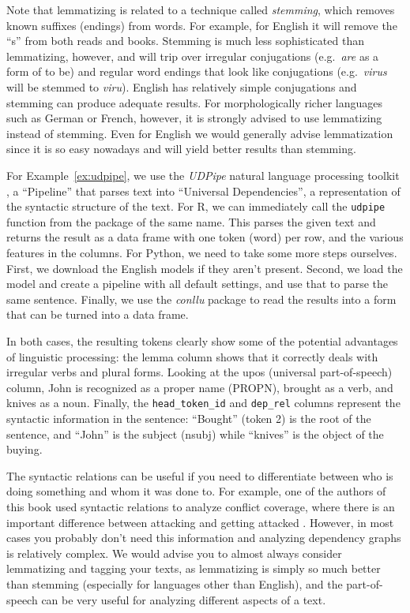 Note that lemmatizing is related to a technique called \emph{stemming}, which removes known suffixes (endings) from words.
For example, for English it will remove the ``s'' from both reads and books.
Stemming is much less sophisticated than lemmatizing, however, and will trip over irregular conjugations
(e.g.\ \emph{are} as a form of to be) and regular word endings that look like conjugations (e.g.\ \emph{virus} will be stemmed to \emph{viru}).
English has relatively simple conjugations and stemming can produce adequate results.
For morphologically richer languages such as German or French, however, it is strongly advised to use lemmatizing instead of stemming.
Even for English we would generally advise lemmatization since it is so easy nowadays and will yield better results than stemming.

For Example~\ref{ex:udpipe}, we use the \emph{UDPipe} natural language processing toolkit \citep{udpipe},
a ``Pipeline'' that parses text into ``Universal Dependencies'', a representation of the syntactic structure of the text.
For R, we can immediately call the \texttt{udpipe} function from the package of the same name.
This parses the given text and returns the result as a data frame with one token (word) per row,
and the various features in the columns.
For Python, we need to take some more steps ourselves.
First, we download the English models if they aren't present.
Second, we load the model and create a pipeline with all default settings,
and use that to parse the same sentence.
Finally, we use the \emph{conllu} package to read the results into a form that can be turned into a data frame.

In both cases, the resulting tokens clearly show some of the potential advantages of linguistic processing:
the lemma column shows that it correctly deals with irregular verbs and plural forms.
Looking at the upos (universal part-of-speech) column, John is recognized as a proper name (PROPN), brought as a verb, and knives as a noun.
Finally, the \verb|head_token_id| and \verb|dep_rel| columns represent the syntactic information in the sentence:
``Bought'' (token 2) is the root of the sentence, and ``John'' is the subject (nsubj) while ``knives'' is the object of the buying.


The syntactic relations can be useful if you need to differentiate between who is doing something and whom it was done to.
For example, one of the authors of this book used syntactic relations to analyze conflict coverage,
where there is an important difference between attacking and getting attacked \citep{clause}.
However, in most cases you probably don't need this information and analyzing dependency graphs is relatively complex.
We would advise you to almost always consider lemmatizing and tagging your texts, as lemmatizing is simply so much better than stemming
(especially for languages other than English), and the part-of-speech can be very useful for analyzing different aspects of a text.

